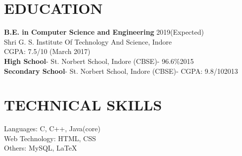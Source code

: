 \documentclass[line, margin]{res}
\begin{document}
\address{\href{mailto: sajal.agrawal1997@gmail.com}{sajal.agrawal1997@gmail.com}\\ +918878155869}
\begin{resume}

\section{EDUCATION}
\textbf{B.E. in Computer Science and Engineering} \hfill 2019(Expected)\\
Shri G. S. Institute Of Technology And Science, Indore\\
CGPA: 7.5/10 (March 2017)\\
\textbf{High School}- St. Norbert School, Indore (CBSE)- 96.6\%\hfill 2015\\
\textbf{Secondary School}- St. Norbert School, Indore (CBSE)- CGPA: 9.8/10\hfill 2013\\

\section{TECHNICAL SKILLS}
Languages: C, C++, Java(core)\\
Web Technology: HTML, CSS\\
Others: MySQL, \LaTeX\\


\end{resume}
\end{document}
